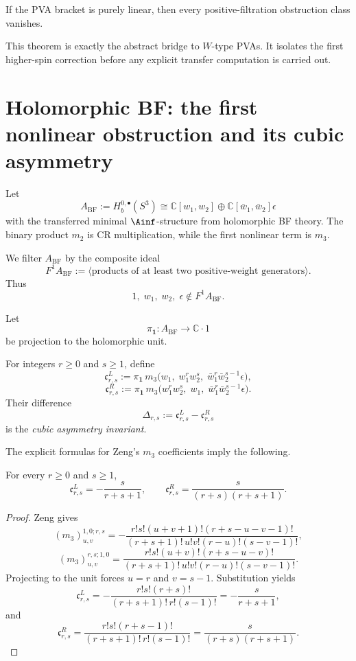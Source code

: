 \begin{corollary}
If the PVA bracket is purely linear, then every positive-filtration obstruction class vanishes.
\end{corollary}

\begin{remark}
This theorem is exactly the abstract bridge to $W$-type PVAs. It isolates the first higher-spin correction before any explicit transfer computation is carried out.
\end{remark}

\section{Holomorphic BF: the first nonlinear obstruction and its cubic asymmetry}

Let
\[
A_{\mathrm{BF}}:=H_b^{0,\bullet}(S^3)\cong \mathbb{C}[w_1,w_2]\oplus \mathbb{C}[\bar w_1,\bar w_2]\epsilon
\]
with the transferred minimal $\Ainf$-structure from holomorphic BF theory. The binary product $m_2$ is CR multiplication, while the first nonlinear term is $m_3$.

We filter $A_{\mathrm{BF}}$ by the composite ideal
\[
F^1A_{\mathrm{BF}}:=\langle \text{products of at least two positive-weight generators}\rangle.
\]
Thus
\[
1,\; w_1,\; w_2,\; \epsilon \notin F^1A_{\mathrm{BF}}.
\]

Let
\[
\pi_{\mathbf 1}:A_{\mathrm{BF}}\to \mathbb{C}\cdot 1
\]
be projection to the holomorphic unit.

\begin{definition}
For integers $r\ge0$ and $s\ge1$, define
\[
\mathfrak c^L_{r,s}:=
\pi_{\mathbf 1}\,m_3\bigl(w_1,\;w_1^rw_2^s,\;\bar w_1^r\bar w_2^{s-1}\epsilon\bigr),
\]
\[
\mathfrak c^R_{r,s}:=
\pi_{\mathbf 1}\,m_3\bigl(w_1^rw_2^s,\;w_1,\;\bar w_1^r\bar w_2^{s-1}\epsilon\bigr).
\]
Their difference
\[
\Delta_{r,s}:=\mathfrak c^L_{r,s}-\mathfrak c^R_{r,s}
\]
is the \emph{cubic asymmetry invariant}.
\end{definition}

The explicit formulas for Zeng's $m_3$ coefficients imply the following.

\begin{proposition}
For every $r\ge0$ and $s\ge1$,
\[
\mathfrak c^L_{r,s}=-\frac{s}{r+s+1},
\qquad
\mathfrak c^R_{r,s}=\frac{s}{(r+s)(r+s+1)}.
\]
\end{proposition}

\begin{proof}
Zeng gives
\[
(m_3)^{1,0;r,s}_{u,v}
= - \frac{r!s!(u+v+1)!(r+s-u-v-1)!}{(r+s+1)!\,u!v!(r-u)!(s-v-1)!},
\]
\[
(m_3)^{r,s;1,0}_{u,v}
= \frac{r!s!(u+v)!(r+s-u-v)!}{(r+s+1)!\,u!v!(r-u)!(s-v-1)!}.
\]
Projecting to the unit forces $u=r$ and $v=s-1$. Substitution yields
\[
\mathfrak c^L_{r,s}=-\frac{r!s!(r+s)!}{(r+s+1)!\,r!(s-1)!}
=-\frac{s}{r+s+1},
\]
and
\[
\mathfrak c^R_{r,s}=\frac{r!s!(r+s-1)!}{(r+s+1)!\,r!(s-1)!}
=\frac{s}{(r+s)(r+s+1)}.
\]
\end{proof}

